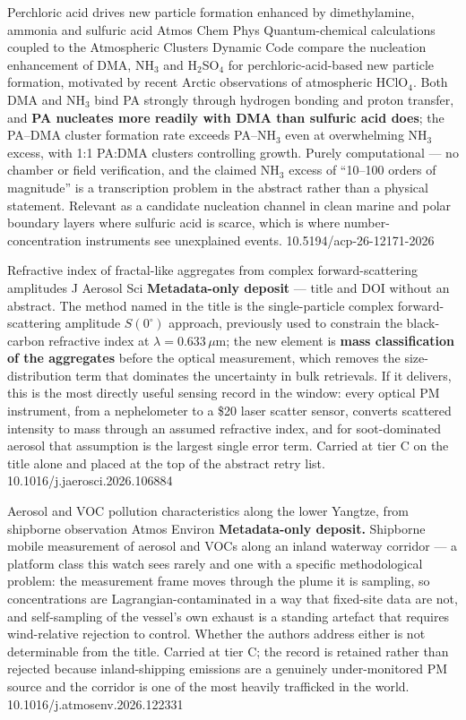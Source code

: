 \documentclass[10pt]{article}
\begin{document}
{Perchloric acid drives new particle formation enhanced by dimethylamine, ammonia and sulfuric acid}
{Atmos Chem Phys}
{Quantum-chemical calculations coupled to the Atmospheric Clusters Dynamic Code compare
the nucleation enhancement of DMA, NH$_3$ and H$_2$SO$_4$ for perchloric-acid-based new
particle formation, motivated by recent Arctic observations of atmospheric HClO$_4$.
Both DMA and NH$_3$ bind PA strongly through hydrogen bonding and proton transfer, and
\textbf{PA nucleates more readily with DMA than sulfuric acid does}; the PA--DMA cluster
formation rate exceeds PA--NH$_3$ even at overwhelming NH$_3$ excess, with 1:1
PA:DMA clusters controlling growth. Purely computational --- no chamber or field
verification, and the claimed NH$_3$ excess of ``10--100 orders of magnitude'' is a
transcription problem in the abstract rather than a physical statement. Relevant as a
candidate nucleation channel in clean marine and polar boundary layers where sulfuric
acid is scarce, which is where number-concentration instruments see unexplained events.}
{10.5194/acp-26-12171-2026}

{Refractive index of fractal-like aggregates from complex forward-scattering amplitudes}
{J Aerosol Sci}
{\textbf{Metadata-only deposit} --- title and DOI without an abstract. The method named in
the title is the single-particle complex forward-scattering amplitude $S(0^\circ)$
approach, previously used to constrain the black-carbon refractive index at
$\lambda = 0.633\,\mu$m; the new element is \textbf{mass classification of the aggregates}
before the optical measurement, which removes the size-distribution term that dominates
the uncertainty in bulk retrievals. If it delivers, this is the most directly useful
sensing record in the window: every optical PM instrument, from a nephelometer to a
\$20 laser scatter sensor, converts scattered intensity to mass through an assumed
refractive index, and for soot-dominated aerosol that assumption is the largest single
error term. Carried at tier C on the title alone and placed at the top of the abstract
retry list.}
{10.1016/j.jaerosci.2026.106884}

{Aerosol and VOC pollution characteristics along the lower Yangtze, from shipborne observation}
{Atmos Environ}
{\textbf{Metadata-only deposit.} Shipborne mobile measurement of aerosol and VOCs along an
inland waterway corridor --- a platform class this watch sees rarely and one with a
specific methodological problem: the measurement frame moves through the plume it is
sampling, so concentrations are Lagrangian-contaminated in a way that fixed-site data are
not, and self-sampling of the vessel's own exhaust is a standing artefact that requires
wind-relative rejection to control. Whether the authors address either is not
determinable from the title. Carried at tier C; the record is retained rather than
rejected because inland-shipping emissions are a genuinely under-monitored PM source and
the corridor is one of the most heavily trafficked in the world.}
{10.1016/j.atmosenv.2026.122331}
\end{document}
